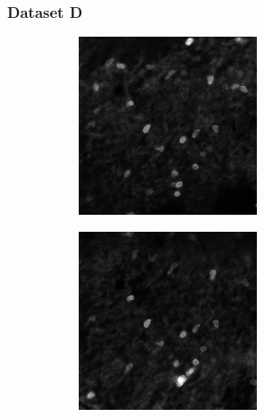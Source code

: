 	\subsubsection{Dataset D}
	\label{sec:datasetD}
	\begin{figure}[h]
		\begin{subfigure}{.32\textwidth}
		\includegraphics[width=\textwidth]{images/series14croppedclean024}
		\end{subfigure}%
		\hfill
		\begin{subfigure}{.32\textwidth}
		\includegraphics[width=\textwidth]{images/series14croppedclean025}

\end{subfigure}
\end{figure}
